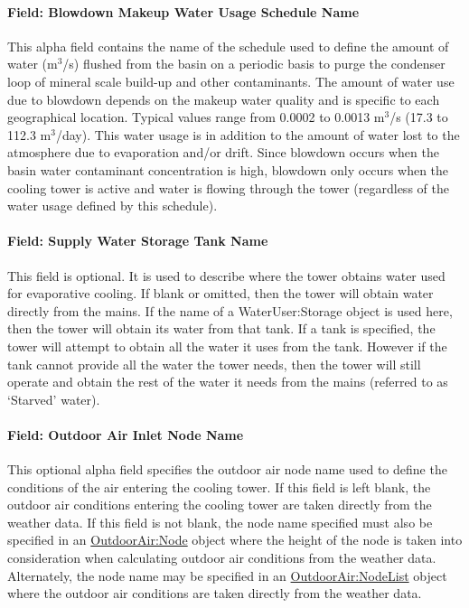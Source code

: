 \paragraph{Field: Blowdown Makeup Water Usage Schedule Name}\label{field-blowdown-makeup-water-usage-schedule-name-3}

This alpha field contains the name of the schedule used to define the amount of water (m\(^{3}\)/s) flushed from the basin on a periodic basis to purge the condenser loop of mineral scale build-up and other contaminants. The amount of water use due to blowdown depends on the makeup water quality and is specific to each geographical location. Typical values range from 0.0002 to 0.0013 m\(^{3}\)/s (17.3 to 112.3 m\(^{3}\)/day). This water usage is in addition to the amount of water lost to the atmosphere due to evaporation and/or drift. Since blowdown occurs when the basin water contaminant concentration is high, blowdown only occurs when the cooling tower is active and water is flowing through the tower (regardless of the water usage defined by this schedule).

\paragraph{Field: Supply Water Storage Tank Name}\label{field-supply-water-storage-tank-name-3}

This field is optional. It is used to describe where the tower obtains water used for evaporative cooling. If blank or omitted, then the tower will obtain water directly from the mains. If the name of a WaterUser:Storage object is used here, then the tower will obtain its water from that tank. If a tank is specified, the tower will attempt to obtain all the water it uses from the tank. However if the tank cannot provide all the water the tower needs, then the tower will still operate and obtain the rest of the water it needs from the mains (referred to as `Starved' water).

\paragraph{Field: Outdoor Air Inlet Node Name}\label{field-outdoor-air-inlet-node-name-3}

This optional alpha field specifies the outdoor air node name used to define the conditions of the air entering the cooling tower. If this field is left blank, the outdoor air conditions entering the cooling tower are taken directly from the weather data. If this field is not blank, the node name specified must also be specified in an \hyperref[outdoorairnode]{OutdoorAir:Node} object where the height of the node is taken into consideration when calculating outdoor air conditions from the weather data. Alternately, the node name may be specified in an \hyperref[outdoorairnodelist]{OutdoorAir:NodeList} object where the outdoor air conditions are taken directly from the weather data.

